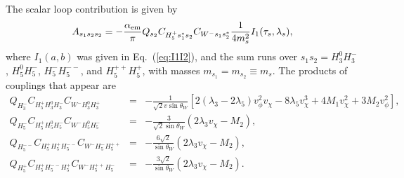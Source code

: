 \documentclass[11pt]{article}
\begin{document}
The scalar loop contribution is given by~\cite{loops,HHG}
\begin{equation}
	A_{s_1s_2s_2} = - \frac{\alpha_{\rm em}}{\pi} Q_{s_2} C_{H_5^+ s_1^* s_2} C_{W^- s_1 s_2^*} \frac{1}{4 m_s^2} I_1(\tau_s, \lambda_s),
\end{equation}
where $I_1(a,b)$ was given in Eq.~(\ref{eq:I1I2}), and the sum runs over $s_1s_2 = H_3^0 H_3^-$, $H_5^0 H_5^-$, $H_5^- H_5^{--}$, and $H_5^{++} H_5^+$, with masses $m_{s_1} = m_{s_2} \equiv m_s$.  The products of couplings that appear are
\begin{eqnarray}
	Q_{H_3^-} C_{H_5^+ H_3^0 H_3^-} C_{W^- H_3^0 H_3^+} &=& - \frac{1}{\sqrt{2} v \sin\theta_W} 
	\left[ 2(\lambda_3 - 2 \lambda_5) v_{\phi}^2 v_{\chi} - 8 \lambda_5 v_{\chi}^3 
	+ 4 M_1 v_{\chi}^2 + 3 M_2 v_{\phi}^2 \right], \\
	Q_{H_5^-} C_{H_5^+ H_5^0 H_5^-} C_{W^- H_5^0 H_5^-} &=& - \frac{3}{\sqrt{2} \sin\theta_W} (2 \lambda_3 v_{\chi} - M_2), \\
	Q_{H_5^{--}} C_{H_5^+ H_5^+ H_5^{--}} C_{W^- H_5^- H_5^{++}} &=& -\frac{6 \sqrt{2}}{\sin\theta_W} (2 \lambda_3 v_{\chi} - M_2), \\
	Q_{H_5^+} C_{H_5^+ H_5^{--} H_5^+} C_{W^- H_5^{++} H_5^-} &=& -\frac{3 \sqrt{2}}{\sin\theta_W} (2 \lambda_3 v_{\chi} - M_2).
\end{eqnarray}
\end{document}
